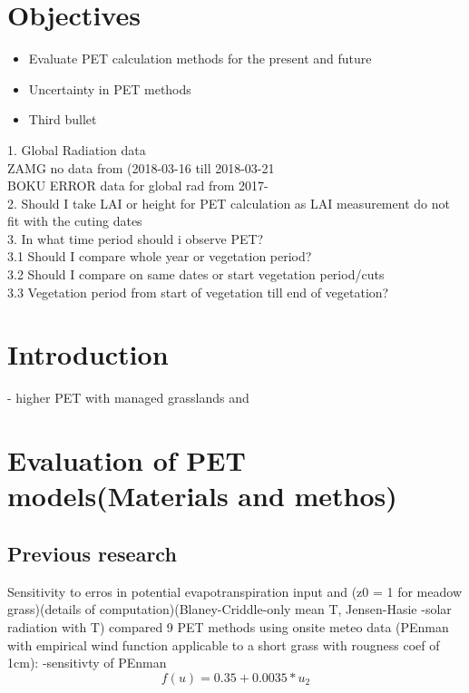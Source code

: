 \documentclass[hydrology,article,submit,moreauthors,pdftex]{Definitions/mdpi}
\begin{document}

\setcounter{section}{-1} %




\section{Objectives}
\begin{itemize}[leftmargin=*,labelsep=5.8mm]
	\item	Evaluate PET calculation methods for the present and future
	\item	Uncertainty in PET methods
	\item	Third bullet
\end{itemize} 
1. Global Radiation data \\
ZAMG no data from (2018-03-16 till 2018-03-21 \\
BOKU ERROR data for global rad from 2017-
\\

2. Should I take LAI or height for PET calculation as LAI measurement do not fit with the cuting dates
\\

3. In what time period should i observe PET? \\
3.1 Should I compare whole year or vegetation period? \\
3.2 Should I compare on same dates or start vegetation period/cuts \\
3.3 Vegetation period from start of vegetation till end of vegetation? \\

\section{Introduction}
\cite{obojes2015vegetation} - higher PET with managed grasslands and \cite{leitinger2015impact}


\section{Evaluation of PET models(Materials and methos)}

\subsection{Previous research}
Sensitivity to erros in potential evapotranspiration input \cite{parmele1972errors}
\cite{parmele1974comparisons} and \cite{mcguinness1972comparison}(z0 = 1 for meadow grass)(details of computation)(Blaney-Criddle-only mean T, Jensen-Hasie \cite{jensen1963estimating}-solar radiation with T) compared 9 PET methods using onsite meteo data
(PEnman with empirical wind function applicable to a short grass with rougness coef of 1cm): 
\cite{andreassian2004impact}-sensitivty of PEnman
\begin{equation}
f(u)=0.35+0.0035*u_2
\end{equation}
\end{document}
